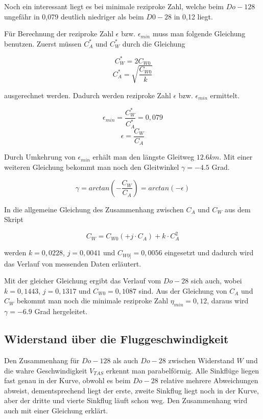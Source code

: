 Noch ein interessant liegt es bei minimale reziproke Zahl, welche beim $Do - 128$ ungefähr in 0,079 deutlich niedriger als beim $D0 - 28$ in 0,12 liegt.

Für Berechnung der reziproke Zahl $\epsilon$ bzw. $\epsilon_{min}$ muss man folgende Gleichung benutzen. Zuerst müssen $C_{A}^{*}$ und $C_{W}^{*}$ durch die Gleichung 

\begin{equation*}
C_{W}^{*} = 2 C_{W0}
\end{equation*}
\begin{equation*}
C_{A}^{*} = \sqrt{\frac{C_{W0}}{k}}
\end{equation*}

ausgerechnet werden. Dadurch werden reziproke Zahl $\epsilon$ bzw. $\epsilon_{min}$ ermittelt.

\begin{equation*}
\epsilon_{min} = \frac{C_{W}^{*}}{C_{A}^{*}} = 0,079
\end{equation*}
\begin{equation*}
\epsilon = \frac{C_{W}}{C_{A}}
\end{equation*}

Durch Umkehrung von $\epsilon_{min}$ erhält man den längste Gleitweg $12.6 km$. Mit einer weiteren Gleichung bekommt man noch den Gleitwinkel $\gamma = -4.5$ Grad.

\begin{equation*}
\gamma = arctan(-\frac{C_{W}}{C_{A}}) = arctan( -\epsilon)
\end{equation*}

In die allgemeine Gleichung des Zusammenhang zwischen $C_{A}$ und $C_{W}$ aus dem Skript  

\begin{equation*}
C_{W} = C_{W{0}} (+j \cdot C_{A}) + k \cdot C_{A}^{2}
\end{equation*}

werden $k = 0,0228$, $j = 0,0041$ und $C_{W{0]}} = 0,0056$ eingesetzt und dadurch wird das Verlauf von messenden Daten erläutert. 

Mit der gleicher Gleichung ergibt das Verlauf vom $Do - 28$ sich auch, wobei $k = 0,1443$, $j = 0,1317$ und $C_{W{0}} = 0,1087$ sind. Aus der Gleichung von $C_{A}$ und $C_{W}$ bekommt man noch die minimale reziproke Zahl $\eta_{min} = 0,12$, daraus wird $\gamma = -6.9$ Grad hergeleitet.

\subsection{Widerstand über die Fluggeschwindigkeit}
Den Zusammenhang für $Do -128$ als auch $Do - 28$ zwischen Widerstand $W$ und die wahre Geschwindigkeit $V_{TAS}$ erkennt man parabelförmig. Alle Sinkflüge liegen fast genau in der Kurve, obwohl es beim $Do -28$ relative mehrere Abweichungen abweist, dementsprechend liegt der erste, zweite Sinkflug liegt noch in der Kurve, aber der dritte und vierte Sinkflug läuft schon weg. Den Zusammenhang wird auch mit einer Gleichung erklärt.

